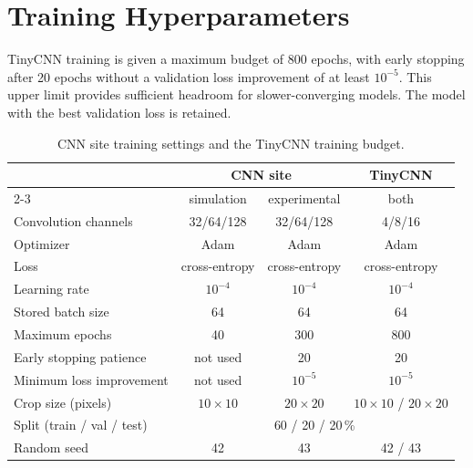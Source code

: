 \clearpage
\section{Training Hyperparameters}\label{app:training}

TinyCNN training is given a maximum budget of 800 epochs, with early stopping after 20 epochs without a validation loss improvement of at least $10^{-5}$. This upper limit provides sufficient headroom for slower-converging models. The model with the best validation loss is retained.

\begin{table}[H]
    \centering
    \small
    \setlength{\tabcolsep}{4pt}
    \caption{CNN site training settings and the TinyCNN training budget.}
    \begin{tabular}{@{}lccc@{}}
        \toprule
        & \multicolumn{2}{c}{CNN site} & TinyCNN \\
        \cmidrule(lr){2-3}
        & simulation & experimental & both \\
        \midrule
        Convolution channels & 32/64/128 & 32/64/128 & 4/8/16 \\
        Optimizer & Adam & Adam & Adam \\
        Loss & cross-entropy & cross-entropy & cross-entropy \\
        Learning rate & $10^{-4}$ & $10^{-4}$ & $10^{-4}$ \\
        Stored batch size & 64 & 64 & 64 \\
        Maximum epochs & 40 & 300 & 800 \\
        Early stopping patience & not used & 20 & 20 \\
        Minimum loss improvement & not used & $10^{-5}$ & $10^{-5}$ \\
        Crop size (pixels) & $10\times10$ & $20\times20$ & $10\times10$ / $20\times20$ \\
        Split (train / val / test) & \multicolumn{3}{c}{60 / 20 / 20\,\%} \\
        Random seed & 42 & 43 & 42 / 43 \\
        \bottomrule
    \end{tabular}
\end{table}
